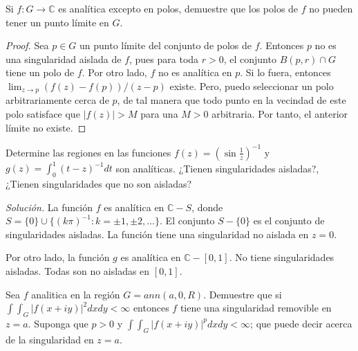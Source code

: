 \documentclass[12pt]{article}
\newcommand{\C}{\mathbb{C}}
\newenvironment{problem}[2][Problema]{\begin{trivlist}
\item[\hskip \labelsep {\bfseries #1}\hskip \labelsep {\bfseries #2.}]}{\end{trivlist}}
\begin{document}
\begin{problem}{6 pp. 110} Si $f: G \rightarrow \C$ es analítica excepto en polos, demuestre que los polos de $f$ no pueden tener un punto límite en $G.$
\end{problem}
\begin{proof}
Sea $p \in G$ un punto límite del conjunto de polos de $f$. Entonces $p$ no es una singularidad aislada de $f$, pues para toda $r > 0$, el conjunto $B(p, r) \cap G$ tiene un polo de $f$.
Por otro lado, $f$ no es analítica en $p$. Si lo fuera, entonces $\lim_{z \to p} (f(z) - f(p)) / (z-p)$ existe. Pero, puedo seleccionar un polo arbitrariamente cerca de $p$, de tal manera que todo punto en la vecindad de este polo satisface que $\lvert f(z) \rvert > M$ para una $M > 0$ arbitraria. Por tanto, el anterior límite no existe. 
\end{proof}

\begin{problem}{16 pp. 112} Determine las regiones en las funciones $f(z) = \left( \sin \frac{1}{z} \right)^{-1}$ y $g(z) = \int_0^1 (t - z)^{-1} dt$ son analíticas. ¿Tienen singularidades aisladas?, ¿Tienen singularidades que no son aisladas?
\end{problem}
\textit{Solución.} La función $f$ es analítica en $\C - S$, donde $S =\{0\} \cup   \{(k \pi)^{-1}: k = \pm 1, \pm 2, \ldots \}$. El conjunto $S - \{0\}$ es el conjunto de singularidades aisladas. La función tiene una singularidad no aislada en $z=0.$

Por otro lado, la función $g$ es analítica en $\C - [0, 1].$ No tiene singularidades aisladas. Todas son no aisladas en $[0, 1].$

\begin{problem}{17 pp. 112} Sea $f$ analitica en la región $G = ann(a, 0, R).$ Demuestre que si $\int \int_G \lvert f(x + iy) \rvert^2 dx dy < \infty$ entonces $f$ tiene una singularidad removible en $z = a.$ Suponga que $p > 0$ y $\int \int_G \lvert f(x + iy) \rvert^p dx dy < \infty$; que puede decir acerca de la singularidad en $z = a.$

\end{problem}

\printbibliography
\end{document}
